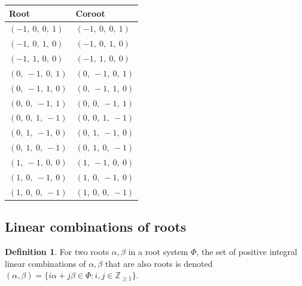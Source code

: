 \documentclass[11pt]{article}
\theoremstyle{definition}
\newtheorem{definition}{Definition}[section]
\begin{document}
\begin{tabular}{|l|l|}
    \hline
    \textbf{Root} & \textbf{Coroot} \\
    \hline
    $\left( -1, \  0, \  0, \  1\right)$ & $\left( -1, \  0, \  0, \  1\right)$ \\
    \hline
    $\left( -1, \  0, \  1, \  0\right)$ & $\left( -1, \  0, \  1, \  0\right)$ \\
    \hline
    $\left( -1, \  1, \  0, \  0\right)$ & $\left( -1, \  1, \  0, \  0\right)$ \\
    \hline
    $\left( 0, \  -1, \  0, \  1\right)$ & $\left( 0, \  -1, \  0, \  1\right)$ \\
    \hline
    $\left( 0, \  -1, \  1, \  0\right)$ & $\left( 0, \  -1, \  1, \  0\right)$ \\
    \hline
    $\left( 0, \  0, \  -1, \  1\right)$ & $\left( 0, \  0, \  -1, \  1\right)$ \\
    \hline
    $\left( 0, \  0, \  1, \  -1\right)$ & $\left( 0, \  0, \  1, \  -1\right)$ \\
    \hline
    $\left( 0, \  1, \  -1, \  0\right)$ & $\left( 0, \  1, \  -1, \  0\right)$ \\
    \hline
    $\left( 0, \  1, \  0, \  -1\right)$ & $\left( 0, \  1, \  0, \  -1\right)$ \\
    \hline
    $\left( 1, \  -1, \  0, \  0\right)$ & $\left( 1, \  -1, \  0, \  0\right)$ \\
    \hline
    $\left( 1, \  0, \  -1, \  0\right)$ & $\left( 1, \  0, \  -1, \  0\right)$ \\
    \hline
    $\left( 1, \  0, \  0, \  -1\right)$ & $\left( 1, \  0, \  0, \  -1\right)$ \\
    \hline
\end{tabular}


\subsection{Linear combinations of roots}

\begin{definition}
For two roots $\alpha, \beta$ in a root system $\Phi$, the set of positive integral linear combinations of $\alpha, \beta$ that are also roots is denoted
\(
	(\alpha, \beta) = \{ i \alpha + j \beta \in \Phi : i, j \in \mathbb{Z}_{\ge 1} \}
\).
\end{definition}
\end{document}
